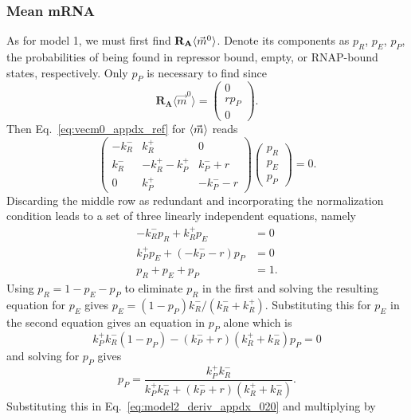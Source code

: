 \subsubsection{Mean mRNA}
As for model 1, we must first find $\mathbf{R_A} \langle\vec{m}^0\rangle$.
Denote its components as $p_R$, $p_E$, $p_P$, the probabilities of being found
in repressor bound, empty, or RNAP-bound states, respectively. Only $p_P$ is
necessary to find since
\begin{equation}
\mathbf{R_A} \langle\vec{m}^0\rangle
= \begin{pmatrix} 0 \\ r p_P \\ 0 \end{pmatrix}.
\label{eq:model2_deriv_appdx_020}
\end{equation}
Then Eq.~\ref{eq:vecm0_appdx_ref} for $\langle\vec{m}\rangle$ reads
\begin{equation}
\begin{pmatrix} -k_R^- & k_R^+ & 0 \\
        k_R^- & -k_R^+ -k_P^+ & k_P^- + r\\
        0 & k_P^+ & -k_P^- - r
\end{pmatrix}
\begin{pmatrix}
    p_R \\ p_E \\ p_P
\end{pmatrix}
= 0.
\label{eq:model2_K-R+R_for_m0}
\end{equation}
Discarding the middle row as redundant and incorporating the normalization
condition leads to a set of three linearly independent equations, namely
\begin{align}
-k_R^- p_R + k_R^+ p_E &= 0 \\
k_P^+ p_E + (-k_P^- - r) p_P &= 0 \\
p_R + p_E + p_P &= 1.
\end{align}
Using $p_R = 1 - p_E - p_P$ to eliminate $p_R$ in the first and solving the
resulting equation for $p_E$ gives
$p_E = (1 - p_P){k_R^-}/{(k_R^- + k_R^+)}$.
Substituting this for $p_E$ in the second equation gives an equation in
$p_P$ alone which is
\begin{equation}
k_P^+ k_R^- (1-p_P) - (k_P^- + r)(k_R^+ + k_R^-) p_P = 0
\end{equation}
and solving for $p_P$ gives
\begin{equation}
p_P = \frac{k_P^+ k_R^-}{k_P^+ k_R^- + (k_P^- + r)(k_R^+ + k_R^-)}.
\end{equation}
Substituting this in Eq.~\ref{eq:model2_deriv_appdx_020} and multiplying by
